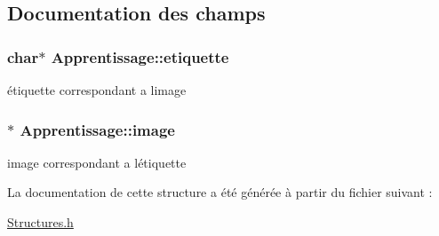\subsection{Documentation des champs}
\subsubsection[{\texorpdfstring{etiquette}{etiquette}}]{\setlength{\rightskip}{0pt plus 5cm}char$\ast$ Apprentissage\+::etiquette}\hypertarget{structApprentissage_af1668167b1678d621bb9b88573f55be7}{}\label{structApprentissage_af1668167b1678d621bb9b88573f55be7}
étiquette correspondant a l\textquotesingle{}image 
\subsubsection[{\texorpdfstring{image}{image}}]{$\ast$ Apprentissage\+::image}\hypertarget{structApprentissage_af3defb9d6e44f5ca0fe145113cec1943}{}\label{structApprentissage_af3defb9d6e44f5ca0fe145113cec1943}
image correspondant a l\textquotesingle{}étiquette 

La documentation de cette structure a été générée à partir du fichier suivant \+:\begin{DoxyCompactItemize}
\item 
\hyperlink{Structures_8h}{Structures.\+h}\end{DoxyCompactItemize}
